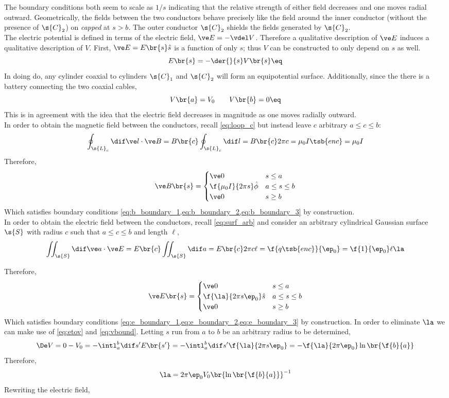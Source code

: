 \documentclass{article}
\begin{document}
The boundary conditions both seem to scale as ${1}/{s}$ indicating that the relative strength of either field decreases and one moves radial outward. Geometrically, the fields between the two conductors behave precisely like the field around the inner conductor (without the presence of $\s{C}_2$) on \textit{capped} at $s > b$. The outer conductor $\s{C}_2$ shields the fields generated by $\s{C}_2$. \\

The electric potential is defined in terms of the electric field, $\ve E = - \vdel V$. Therefore a qualitative description of $\ve E$ induces a qualitative description of $V$. First, $\ve E = E\br{s} \hat{s}$ is a function of only $s$; thus $V$ can be constructed to only depend on $s$ as well.
\[ E\br{s} = - \der{}{s} V\br{s} \eq \label{eq:etov}\]
In doing do, any cylinder coaxial to cylinders $\s{C}_1$ and $\s{C}_2$ will form an equipotential surface. Additionally, since the there is a battery connecting the two coaxial cables,
\[ V\br{a} = V_0 \qquad V\br{b} = 0 \eq \label{eq:vbound} \]
This is in agreement with the idea that the electric field decreases in magnitude as one moves radially outward.\\

In order to obtain the magnetic field between the conductors, recall \cref{eq:loop_c} but instead leave $c$ arbitrary $a \leq c \leq b$:
\[ \oint_{\s{L}_c} \dif \ve l \cdot \ve B = B\br{c} \oint_{\s{L}_c} \dif l = B\br{c} 2 \pi c = \mu_0 I\tsb{enc} = \mu_0 I \]
Therefore,
\[ \ve B \br{s} = \begin{cases}
    \ve 0 & s \leq a \\
    \f{\mu_0 I}{2 \pi s}\hat{\phi} & a \leq s \leq b \\
    \ve 0 & s \geq b
\end{cases} \]
Which satisfies boundary conditions \cref{eq:b_boundary_1,eq:b_boundary_2,eq:b_boundary_3} by construction.\\

In order to obtain the electric field between the conductors, recall \cref{eq:surf_arb} and consider an arbitrary cylindrical Gaussian surface $\s{S}$ with radius $c$ such that $a \leq c \leq b$ and length $\ell$,
\[ \iint_{\s{S}} \dif \ve a \cdot \ve E = E\br{c} \iint_{\s{S}} \dif a = E\br{c} 2 \pi c \ell = \f{q\tsb{enc}}{\ep_0} = \f{1}{\ep_0} \ell \la  \]

Therefore,
\[ \ve E \br{s} = \begin{cases}
    \ve 0 & s \leq a \\
    \f{\la}{2 \pi s \ep_0}\hat{s} & a \leq s \leq b \\
    \ve 0 & s \geq b
\end{cases} \]
Which satisfies boundary conditions \cref{eq:e_boundary_1,eq:e_boundary_2,eq:e_boundary_3} by construction. In order to eliminate $\la$ we can make use of \cref{eq:etov} and \cref{eq:vbound}. Letting $s$ run from $a$ to $b$ be an arbitrary radius to be determined,
\[ \De V = 0 - V_0 = -\intl_{a}^{b} \dif s' E\br{s'} = -\intl_{a}^{b} \dif s' \f{\la}{2 \pi s \ep_0} = -\f{\la}{2 \pi \ep_0} \ln\br{\f{b}{a}} \]
Therefore,
\[ \la = 2 \pi \ep_0 V_0 \br{\ln\br{\f{b}{a}}}^{-1} \]
Rewriting the electric field,
\end{document}
